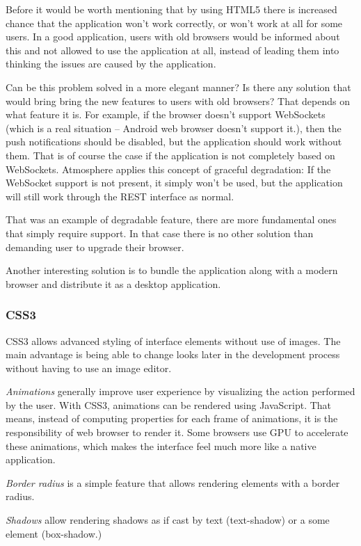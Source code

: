 Before it would be worth mentioning that by using HTML5 there is increased chance that the application won’t work correctly, or won’t work at all for some users. In a good application, users with old browsers would be informed about this and not allowed to use the application at all, instead of leading them into thinking the issues are caused by the application. 

Can be this problem solved in a more elegant manner? Is there any solution that would bring bring the new features to users with old browsers? That depends on what feature it is. For example, if the browser doesn’t support WebSockets (which is a real situation – Android web browser doesn’t support it.), then the push notifications should be disabled, but the application should work without them. That is of course the case if the application is not completely based on WebSockets. Atmosphere applies this concept of graceful degradation: If the WebSocket support is not present, it simply won’t be used, but the application will still work through the REST interface as normal.

That was an example of degradable feature, there are more fundamental ones that simply require support. In that case there is no other solution than demanding user to upgrade their browser.

Another interesting solution is to bundle the application along with a modern browser and distribute it as a desktop application.

\subsubsection{CSS3}

CSS3 allows advanced styling of interface elements without use of images. The main advantage is being able to change looks later in the development process without having to use an image editor.

\emph{Animations} generally improve user experience by visualizing the action performed by the user. With CSS3, animations can be rendered using JavaScript. That means, instead of computing properties for each frame of animations, it is the responsibility of web browser to render it. Some browsers use GPU to accelerate these animations, which makes the interface feel much more like a native application. 

\emph{Border radius} is a simple feature that allows rendering elements with a border radius. 

\emph{Shadows} allow rendering shadows as if cast by text (text-shadow) or a some element (box-shadow.) 

